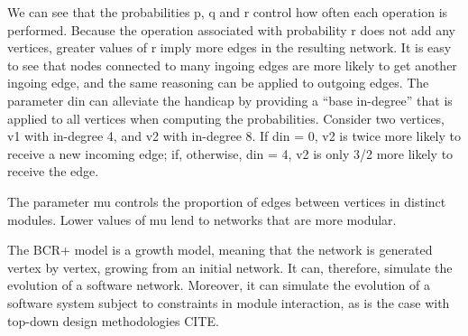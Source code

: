 We can see that the probabilities p, q and r control how often each operation is
performed. Because the operation associated with probability r does not add any
vertices, greater values of r imply more edges in the resulting network. It is
easy to see that nodes connected to many ingoing edges are more likely to get
another ingoing edge, and the same reasoning can be applied to outgoing edges.
The parameter din can alleviate the handicap by providing a ``base in-degree''
that is applied to all vertices when computing the probabilities. Consider
two vertices, v1 with in-degree 4, and v2 with in-degree 8. If din = 0, v2 is
twice more likely to receive a new incoming edge; if, otherwise, din = 4, v2 is
only 3/2 more likely to receive the edge.

The parameter mu controls the proportion of edges between vertices in distinct
modules. Lower values of mu lend to networks that are more modular.

The BCR+ model is a growth model, meaning that the network is generated vertex
by vertex, growing from an initial network. It can, therefore, simulate the
evolution of a software network. Moreover, it can simulate the evolution of a
software system subject to constraints in module interaction, as is the case
with top-down design methodologies CITE.

%
%
%
%

